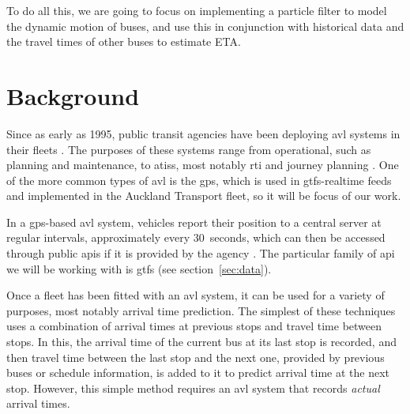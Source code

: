 \documentclass[12pt,a4paper]{article}
\begin{document}
To do all this, we are going to focus on implementing a particle filter to model the dynamic motion of buses,
and use this in conjunction with historical data and the travel times of other buses to estimate ETA.



\section{Background}
\label{sec:background}







Since as early as 1995, public transit agencies have been deploying \gls{avl} systems
in their fleets \citep{cn}.
The purposes of these systems range from operational, such as planning and maintenance, 
to \glspl{atis}, most notably \gls{rti} and journey planning \citep{tcrp:2003}.
One of the more common types of \gls{avl} is the \gls{gps},
which is used in \gls{gtfs}-realtime feeds and implemented in the Auckland Transport
fleet, so it will be focus of our work.


In a \gls{gps}-based \gls{avl} system, vehicles report their position to a central server
at regular intervals, approximately every 30~seconds,
which can then be accessed through public \glspl{api} if it is provided by the agency
\citep{tcrp:2003}.
The particular family of \gls{api} we will be working with is \gls{gtfs}
(see section~\ref{sec:data}).


Once a fleet has been fitted with an \gls{avl} system, 
it can be used for a variety of purposes, most notably arrival time prediction.
The simplest of these techniques uses a combination of arrival times at previous stops
and travel time between stops.
In this, the arrival time of the current bus at its last stop is recorded, 
and then travel time between the last stop and the next one, 
provided by previous buses or schedule information,
is added to it to predict arrival time at the next stop.
However, this simple method requires an \gls{avl} system that records
\emph{actual} arrival times.
\end{document}
